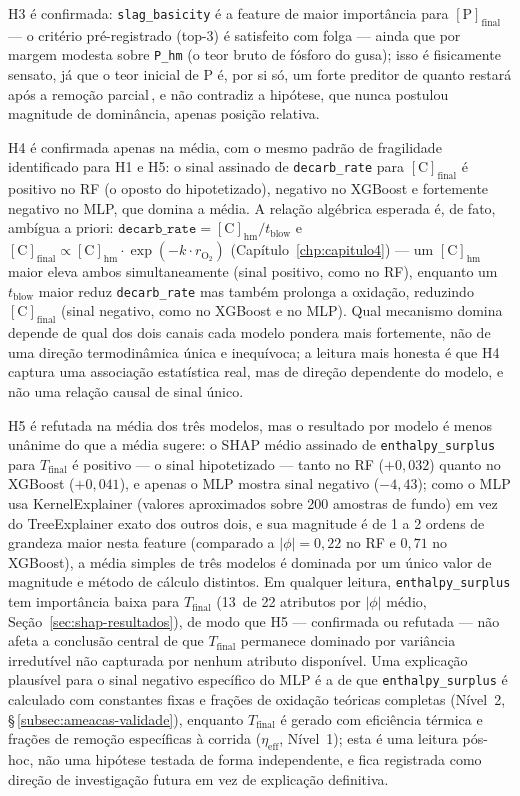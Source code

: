 H3 é confirmada: \texttt{slag\_basicity} é a feature de maior importância para $[\text{P}]_\text{final}$ --- o critério pré-registrado (top-3) é satisfeito com folga --- ainda que por margem modesta sobre \texttt{P\_hm} (o teor bruto de fósforo do gusa); isso é fisicamente sensato, já que o teor inicial de P é, por si só, um forte preditor de quanto restará após a remoção parcial\,\cite{bae2020bof,chattopadhyay2022hybrid}, e não contradiz a hipótese, que nunca postulou magnitude de dominância, apenas posição relativa.

H4 é confirmada apenas na média, com o mesmo padrão de fragilidade identificado para H1 e H5: o sinal assinado de \texttt{decarb\_rate} para $[\text{C}]_\text{final}$ é positivo no RF (o oposto do hipotetizado), negativo no XGBoost e fortemente negativo no MLP, que domina a média. A relação algébrica esperada é, de fato, ambígua a priori: $\texttt{decarb\_rate} = [\text{C}]_\text{hm} / t_\text{blow}$ e $[\text{C}]_\text{final} \propto [\text{C}]_\text{hm} \cdot \exp(-k \cdot r_{\text{O}_2})$ (Capítulo~\ref{chp:capitulo4}) --- um $[\text{C}]_\text{hm}$ maior eleva ambos simultaneamente (sinal positivo, como no RF), enquanto um $t_\text{blow}$ maior reduz \texttt{decarb\_rate} mas também prolonga a oxidação, reduzindo $[\text{C}]_\text{final}$ (sinal negativo, como no XGBoost e no MLP). Qual mecanismo domina depende de qual dos dois canais cada modelo pondera mais fortemente, não de uma direção termodinâmica única e inequívoca; a leitura mais honesta é que H4 captura uma associação estatística real, mas de direção dependente do modelo, e não uma relação causal de sinal único.

H5 é refutada na média dos três modelos, mas o resultado por modelo é menos unânime do que a média sugere: o SHAP médio assinado de \texttt{enthalpy\_surplus} para $T_\text{final}$ é positivo --- o sinal hipotetizado --- tanto no RF ($+0{,}032$) quanto no XGBoost ($+0{,}041$), e apenas o MLP mostra sinal negativo ($-4{,}43$); como o MLP usa KernelExplainer (valores aproximados sobre 200 amostras de fundo) em vez do TreeExplainer exato dos outros dois, e sua magnitude é de 1 a 2 ordens de grandeza maior nesta feature (comparado a $|\phi| = 0{,}22$ no RF e $0{,}71$ no XGBoost), a média simples de três modelos é dominada por um único valor de magnitude e método de cálculo distintos. Em qualquer leitura, \texttt{enthalpy\_surplus} tem importância baixa para $T_\text{final}$ (13\textordmasculine\ de 22 atributos por $|\phi|$ médio, Seção~\ref{sec:shap-resultados}), de modo que H5 --- confirmada ou refutada --- não afeta a conclusão central de que $T_\text{final}$ permanece dominado por variância irredutível não capturada por nenhum atributo disponível. Uma explicação plausível para o sinal negativo específico do MLP é a de que \texttt{enthalpy\_surplus} é calculado com constantes fixas e frações de oxidação teóricas completas (Nível~2, §\,\ref{subsec:ameacas-validade}), enquanto $T_\text{final}$ é gerado com eficiência térmica e frações de remoção específicas à corrida ($\eta_\text{eff}$, Nível~1); esta é uma leitura pós-hoc, não uma hipótese testada de forma independente, e fica registrada como direção de investigação futura em vez de explicação definitiva.

